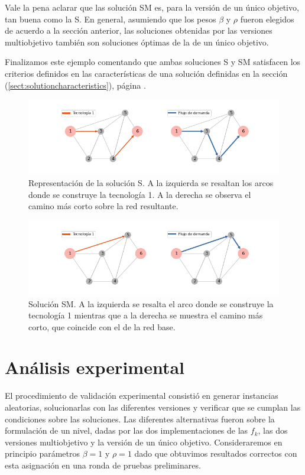 Vale la pena aclarar que las solución SM es, para la versión de un único objetivo, tan buena como la S. En general, asumiendo que los pesos $\beta$ y $\rho$ fueron elegidos de acuerdo a la sección anterior, las soluciones obtenidas por las versiones multiobjetivo también son soluciones óptimas de la de un único objetivo.

Finalizamos este ejemplo comentando que ambas soluciones S y SM satisfacen los criterios definidos en las características de una solución definidas en la sección (\ref{sect:solutioncharacteristics}), página \pageref{sect:solutioncharacteristics}.

\begin{figure}[h!]
  \centering
  \includegraphics[width=12cm]{../resources/example_2_sol_v2.png}
  \caption{Representación de la solución S. A la izquierda se resaltan los arcos donde se construye la tecnología 1. A la derecha se observa el camino más corto sobre la red resultante.}
  \label{fig:example2solv2}
\end{figure}

\begin{figure}[h!]
  \centering
  \includegraphics[width=12cm]{../resources/example_2_sol_v1.png}
  \caption{Solución SM. A la izquierda se resalta el arco donde se construye la tecnología 1 mientras que a la derecha se muestra el camino más corto, que coincide con el de la red base.}
  \label{fig:example2solv1}
\end{figure}

\FloatBarrier
\section{Análisis experimental}

El procedimiento de validación experimental consistió en generar instancias aleatorias, solucionarlas con las diferentes versiones y verificar que se cumplan las condiciones sobre las soluciones. Las diferentes alternativas fueron sobre la formulación de un nivel, dadas por las dos implementaciones de las $f_k$, las dos versiones multiobjetivo y la versión de un único objetivo. Consideraremos en principio parámetros $\beta = 1$ y $\rho = 1$ dado que obtuvimos resultados correctos con esta asignación en una ronda de pruebas preliminares.

